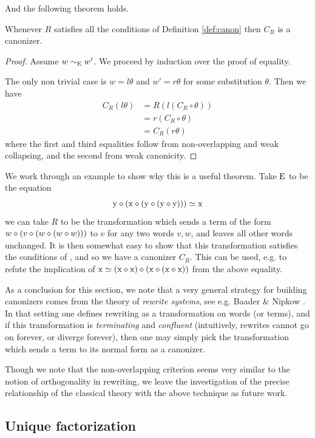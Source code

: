 And the following theorem holds.
\begin{theorem}\label{thm:canon}
  Whenever $R$ satisfies all the conditions of Definition \ref{def:canon} then $C_R$ is a canonizer.
\end{theorem}
\begin{proof}
  Assume $w\sim_{\mathrm{E}}w'$. We proceed by induction over the proof of equality.

  The only non trivial case is $w = l\theta$ and $w'=r\theta$ for some substitution $\theta$.
  Then we have
  \begin{align}
    C_R(l\theta) &= R(l(C_R\circ\theta)) \\
                 &= r(C_R\circ\theta)\\
                 &= C_R(r\theta)
  \end{align}
  where the first and third equalities follow from non-overlapping and weak collapsing, and the second from weak canonicity.
\end{proof}

We work through an example to show why this is a useful theorem. Take $\mathrm{E}$ to be the equation
\[
  \mathrm{y} \diamond (\mathrm{x} \diamond (\mathrm{y} \diamond (\mathrm{y} \diamond \mathrm{y})))\simeq \mathrm{x}
\]
we can take $R$ to be the transformation which sends a term of the form $w \diamond (v \diamond (w \diamond (w \diamond w)))$ to $v$ for any two words $v, w$, and leaves all other words unchanged.
It is then somewhat easy to show that this transformation satisfies the conditions of , and so we have a canonizer $C_R$.
This can be used, e.g. to refute the implication of $\mathrm{x} \simeq (\mathrm{x} \diamond \mathrm{x}) \diamond (\mathrm{x} \diamond (\mathrm{x} \diamond \mathrm{x}))$ from the above equality.

As a conclusion for this section, we note that a very general strategy for building canonizers comes from the theory of \emph{rewrite systems}, see e.g. Baader \& Nipkow \cite{term-rewriting}.
In that setting one defines rewriting as a transformation on words (or terms), and if this transformation is \emph{terminating} and \emph{confluent} (intuitively, rewrites cannot go on forever, or diverge forever), then one may simply pick the transformation which sends a term to its normal form as a canonizer.

Though we note that the non-overlapping criterion seems very similar to the notion of orthogonality in rewriting, we leave the investigation of the precise relationship of the classical theory with the above technique as future work.

\subsection{Unique factorization}

